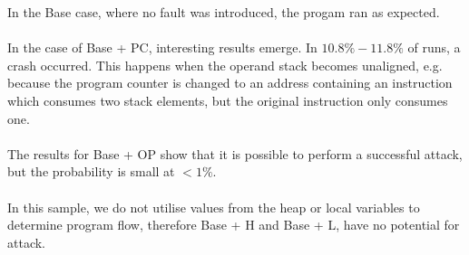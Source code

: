 In the Base case, where no fault was introduced, the progam ran as expected.\\\\
In the case of Base + PC, interesting results emerge. In $10.8\% - 11.8\%$ of runs, a crash occurred. This happens when the operand stack becomes unaligned, e.g. because the program counter is changed to an address containing an instruction which consumes two stack elements, but the original instruction only consumes one.\\\\
The results for Base + OP show that it is possible to perform a successful attack, but the probability is small at $< 1\%$.\\\\
In this sample, we do not utilise values from the heap or local variables to determine program flow, therefore Base + H and Base + L, have no potential for attack.